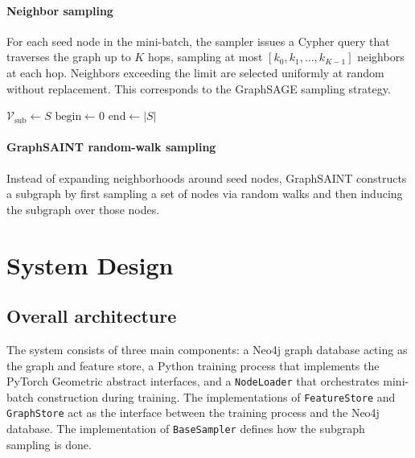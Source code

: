 \documentclass[PhD]{uclathes}
\begin{document}
\subsubsection{Neighbor sampling}
For each seed node in the mini-batch, the sampler issues a Cypher query that
traverses the graph up to $K$ hops, sampling at most
$[k_0, k_1, \ldots, k_{K-1}]$ neighbors at each hop. Neighbors exceeding the
limit are selected uniformly at random without replacement. This corresponds to
the GraphSAGE sampling strategy.

\begin{algorithm}[H]
\footnotesize
\caption{Neighbor Sampling}
\label{algo:neighbor_sampling}
\DontPrintSemicolon
{}

$\mathcal{V}_{\mathrm{sub}} \leftarrow S$\;
$\mathrm{begin} \leftarrow 0$\;
$\mathrm{end} \leftarrow |S|$\;

\;
\end{algorithm}

\subsubsection{GraphSAINT random-walk sampling}
Instead of expanding neighborhoods around seed nodes, GraphSAINT constructs a
subgraph by first sampling a set of nodes via random walks and then inducing
the subgraph over those nodes.

\chapter{System Design}

\section{Overall architecture}\label{sec:sys_arch}
The system consists of three main components: a Neo4j graph database acting as
the graph and feature store, a Python training process that implements the
PyTorch Geometric abstract interfaces, and a \texttt{NodeLoader} that
orchestrates mini-batch construction during training. The implementations of
\texttt{FeatureStore} and \texttt{GraphStore} act as the interface between the
training process and the Neo4j database. The implementation of
\texttt{BaseSampler} defines how the subgraph sampling is done.
\end{document}
